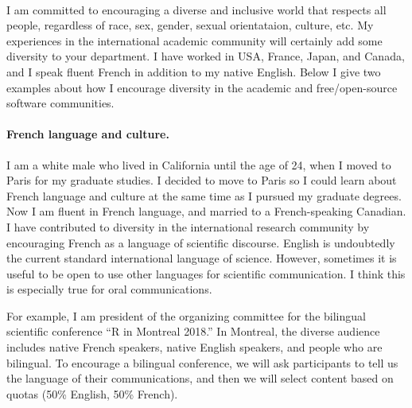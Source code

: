 \documentclass{article}
\begin{document}
\mbox{ }


I am committed to encouraging a diverse and inclusive world that
respects all people, regardless of race, sex, gender, sexual
orientataion, culture, etc. My experiences in the international
academic community will certainly add some diversity to your
department. I have worked in USA, France, Japan, and Canada, and I
speak fluent French in addition to my native English. Below I give two examples about how I
encourage diversity in the academic and free/open-source software
communities. 

\paragraph{French language and culture.}

I am a white male who lived in California until the age of 24, when I
moved to Paris for my graduate studies. I decided to move to Paris so
I could learn about French language and culture at the same time as I
pursued my graduate degrees. Now I am fluent in French language, and
married to a French-speaking Canadian.
I have contributed to diversity in the international research
community by encouraging French as a language of scientific
discourse. English is undoubtedly the current standard international
language of science. However, sometimes it is useful to be open to use
other languages for scientific communication. I think this is
especially true for oral communications.

For example, I am president of the organizing committee for the
bilingual scientific conference ``R in Montreal 2018.'' In Montreal,
the diverse audience includes native French speakers, native English
speakers, and people who are bilingual. To encourage a bilingual
conference, we will ask participants to tell us the language of their
communications, and then we will select content based on quotas (50\%
English, 50\% French).

\end{document}
